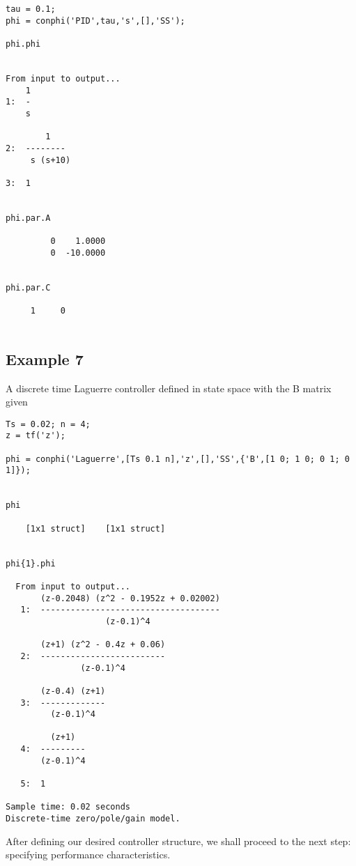 \documentclass [12pt , a4paper] {report}
\begin{document}
\begin{lstlisting}
tau = 0.1;
phi = conphi('PID',tau,'s',[],'SS');

phi.phi

 
From input to output...
    1
1:  -
    s
 
        1
2:  --------
     s (s+10)
 
3:  1


phi.par.A

         0    1.0000
         0  -10.0000


phi.par.C

     1     0
         
\end{lstlisting}


\subsection{Example 7} A discrete time Laguerre controller defined in state space with the B matrix given

\begin{lstlisting}
Ts = 0.02; n = 4;
z = tf('z');

phi = conphi('Laguerre',[Ts 0.1 n],'z',[],'SS',{'B',[1 0; 1 0; 0 1; 0 1]});


phi

	[1x1 struct]    [1x1 struct]

    
phi{1}.phi
    
  From input to output...
       (z-0.2048) (z^2 - 0.1952z + 0.02002)
   1:  ------------------------------------
                    (z-0.1)^4
 
       (z+1) (z^2 - 0.4z + 0.06)
   2:  -------------------------
               (z-0.1)^4
 
       (z-0.4) (z+1)
   3:  -------------
         (z-0.1)^4
 
         (z+1)
   4:  ---------
       (z-0.1)^4
 
   5:  1
 
Sample time: 0.02 seconds
Discrete-time zero/pole/gain model.

\end{lstlisting}


After defining our desired controller structure, we shall proceed to the next step: specifying performance characteristics.
\end{document}
